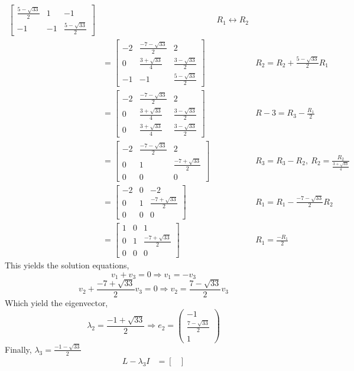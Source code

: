 \documentclass[letterpaper,10pt]{article}
\begin{document}
\begin{enumerate}
\begin{align*}
\begin{bmatrix}
\frac{5-\sqrt{33}}{2} & 1 & -1\\
-1 & -1 & \frac{5-\sqrt{33}}{2}
\end{bmatrix} && R_1\leftrightarrow R_2\\
&=\begin{bmatrix}
-2 & \frac{-7-\sqrt{33}}{2} & 2\\
0 & \frac{3+\sqrt{33}}{4} & \frac{3-\sqrt{33}}{2}\\
-1 & -1 & \frac{5-\sqrt{33}}{2}
\end{bmatrix} && R_2=R_2+\frac{5-\sqrt{33}}{2}R_1\\
&=\begin{bmatrix}
-2 & \frac{-7-\sqrt{33}}{2} & 2\\
0 & \frac{3+\sqrt{33}}{4} & \frac{3-\sqrt{33}}{2}\\
0 & \frac{3+\sqrt{33}}{4} & \frac{3-\sqrt{33}}{2}
\end{bmatrix} && R-3=R_3-\frac{R_1}{2}\\
&=\begin{bmatrix}
-2 & \frac{-7-\sqrt{33}}{2} & 2\\
0 & 1 & \frac{-7+\sqrt{33}}{2}\\
0 & 0 & 0
\end{bmatrix} && R_3=R_3-R_2,\ R_2=\frac{R_2}{\frac{3+\sqrt{33}}{4}}\\
&=\begin{bmatrix}
-2 & 0 & -2\\
0 & 1 & \frac{-7+\sqrt{33}}{2}\\
0 & 0 & 0
\end{bmatrix} && R_1=R_1-\frac{-7-\sqrt{33}}{2}R_2\\
&=\begin{bmatrix}
1 & 0 & 1\\
0 & 1 & \frac{-7+\sqrt{33}}{2}\\
0 & 0 & 0
\end{bmatrix} && R_1=\frac{-R_1}{2}
\end{align*}
This yields the solution equations,
\[v_1+v_3 = 0\Rightarrow v_1=-v_3\]
\[v_2+\frac{-7+\sqrt{33}}{2}v_3=0\Rightarrow v_2=\frac{7-\sqrt{33}}{2}v_3\]
Which yield the eigenvector,
\[\lambda_2=\frac{-1+\sqrt{33}}{2}\Rightarrow e_2=\begin{pmatrix}
-1\\\frac{7-\sqrt{33}}{2}\\1
\end{pmatrix}\]
Finally, $\lambda_3=\frac{-1-\sqrt{33}}{2}$
\begin{align*}
L-\lambda_3 I &= \begin{bmatrix}

\end{bmatrix}
\end{align*}
\end{enumerate}
\end{document}
